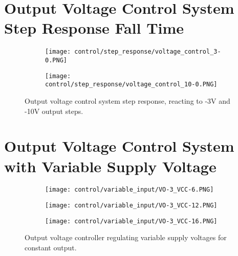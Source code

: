 \section{Output Voltage Control System Step Response Fall Time} \label{A:control_step_fall}
\begin{figure}[H]
    \centering
    \begin{subfigure}{0.7\textwidth}
        \texttt{[image: control/step\_response/voltage\_control\_3-0.PNG]}
    \end{subfigure}
    \begin{subfigure}{0.7\textwidth}
        \texttt{[image: control/step\_response/voltage\_control\_10-0.PNG]}
    \end{subfigure}
    \caption{Output voltage control system step response, reacting to -3V and -10V output steps.}
\end{figure}

\section{Output Voltage Control System with Variable Supply Voltage} \label{A:control_supply_change}
\begin{figure}[H]
    \centering
    \begin{subfigure}{0.62\textwidth}
        \texttt{[image: control/variable\_input/VO-3\_VCC-6.PNG]}
    \end{subfigure}
    \begin{subfigure}{0.62\textwidth}
        \texttt{[image: control/variable\_input/VO-3\_VCC-12.PNG]}
    \end{subfigure}
    \begin{subfigure}{0.62\textwidth}
        \texttt{[image: control/variable\_input/VO-3\_VCC-16.PNG]}
    \end{subfigure}
    \caption{Output voltage controller regulating variable supply voltages for constant output.}
\end{figure}

